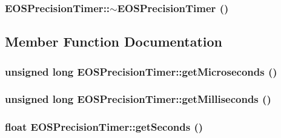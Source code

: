 \hypertarget{classEOSPrecisionTimer_4973b1bf298dd2bf40e3e6408866e5f3}{
\subsubsection[{$\sim$EOSPrecisionTimer}]{\setlength{\rightskip}{0pt plus 5cm}EOSPrecisionTimer::$\sim$EOSPrecisionTimer ()}}
\label{classEOSPrecisionTimer_4973b1bf298dd2bf40e3e6408866e5f3}




\subsection{Member Function Documentation}
\hypertarget{classEOSPrecisionTimer_63c07c72120f792bc79dbd72f3f03d7a}{
\subsubsection[{getMicroseconds}]{\setlength{\rightskip}{0pt plus 5cm}unsigned long EOSPrecisionTimer::getMicroseconds ()}}
\label{classEOSPrecisionTimer_63c07c72120f792bc79dbd72f3f03d7a}


\hypertarget{classEOSPrecisionTimer_3a00c85250081df249a733834dee161b}{
\subsubsection[{getMilliseconds}]{\setlength{\rightskip}{0pt plus 5cm}unsigned long EOSPrecisionTimer::getMilliseconds ()}}
\label{classEOSPrecisionTimer_3a00c85250081df249a733834dee161b}


\hypertarget{classEOSPrecisionTimer_5f4013cc8027df9d6f2116c587cbe932}{
\subsubsection[{getSeconds}]{\setlength{\rightskip}{0pt plus 5cm}float EOSPrecisionTimer::getSeconds ()}}
\label{classEOSPrecisionTimer_5f4013cc8027df9d6f2116c587cbe932}


